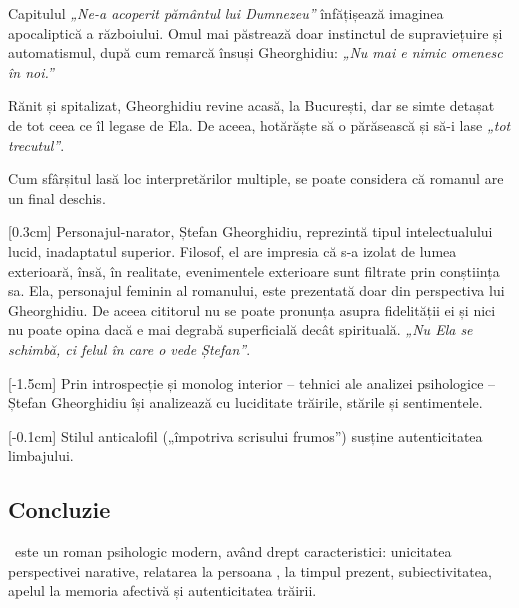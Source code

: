 Capitulul \textit{„Ne-a acoperit pământul lui Dumnezeu”} înfățișează imaginea apocaliptică a războiului. Omul mai păstrează doar instinctul de supraviețuire și automatismul, după cum remarcă însuși Gheorghidiu: \textit{„Nu mai e nimic omenesc în noi.”}

Rănit și spitalizat, Gheorghidiu revine acasă, la București, dar se simte detașat de tot ceea ce îl legase de Ela. De aceea, hotărăște să o părăsească și să-i lase \textit{„tot trecutul”}.

Cum sfârșitul lasă loc interpretărilor multiple, se poate considera că romanul are un final deschis.

[0.3cm]
Personajul-narator, Ștefan Gheorghidiu, reprezintă tipul intelectualului lucid, inadaptatul superior. Filosof, el are impresia că s-a izolat de lumea exterioară, însă, în realitate, evenimentele exterioare sunt filtrate prin conștiința sa. Ela, personajul feminin al romanului, este prezentată doar din perspectiva lui Gheorghidiu. De aceea cititorul nu se poate pronunța asupra fidelității ei și nici nu poate opina dacă e mai degrabă superficială decât spirituală. \textit{„Nu Ela se schimbă, ci felul în care o vede Ștefan”}.

[-1.5cm]
Prin introspecție și monolog interior -- tehnici ale analizei psihologice --  Ștefan \hbox{Gheorghidiu} își analizează cu luciditate trăirile, stările și sentimentele.

[-0.1cm]
Stilul anticalofil („împotriva scrisului frumos”) susține autenticitatea limbajului.


\subsection{Concluzie}

\operatitle\ este un roman psihologic modern, având drept caracteristici: unicitatea perspectivei narative, relatarea la persoana , la timpul prezent, subiectivitatea, apelul la memoria afectivă și autenticitatea trăirii.
